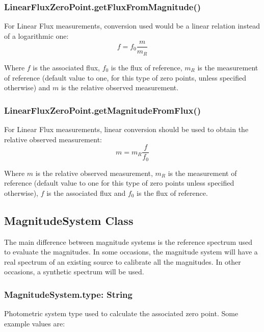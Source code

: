 \documentclass[11pt,a4paper]{ivoa}
\begin{document}
\subsubsection{LinearFluxZeroPoint.getFluxFromMagnitude()}
For Linear Flux measurements, conversion used would be a linear 
relation instead of a logarithmic one:
\begin{equation} \label{eq:29}
f = f_0\frac{m}{m_R}
\end{equation}

Where $f$ is the associated flux, $f_0$ is the flux of reference, $m_R$ is 
the measurement of reference (default value to one, for this type of zero 
points, unless specified otherwise) and $m$ is the relative observed 
measurement.
\par

\subsubsection{LinearFluxZeroPoint.getMagnitudeFromFlux()}
For Linear Flux measurements, linear conversion should be used to obtain 
the relative observed measurement:
\begin{equation} \label{eq:30}
m = m_R \frac{f}{f_0}
\end{equation}

Where $m$ is the relative observed measurement, $m_R$ is the measurement 
of reference (default value to one for this type of zero points unless 
specified otherwise), $f$ is the associated flux and $f_0$ is the flux 
of reference.\par

\subsection{MagnitudeSystem Class}
The main difference between magnitude systems is the reference spectrum 
used to evaluate the magnitudes. In some occasions, the magnitude system 
will have a real spectrum of an existing source to calibrate all the magnitudes. 
In other occasions, a synthetic spectrum will be used.
\par

\subsubsection{MagnitudeSystem.type: String}
Photometric system type used to calculate the associated zero point. 
Some example values are:
\par
\end{document}

